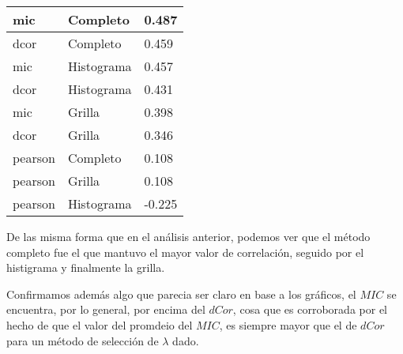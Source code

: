     \begin{table}[H]
        \centering
        \begin{tabular}{|l|l|l|}\hline
        mic     & Completo    & 0.487  \\\hline
        dcor    & Completo    & 0.459  \\
        mic     & Histograma  & 0.457  \\
        dcor    & Histograma  & 0.431  \\
        mic     & Grilla      & 0.398  \\
        dcor    & Grilla      & 0.346 \\
        pearson & Completo    & 0.108  \\
        pearson & Grilla      & 0.108  \\
        pearson & Histograma  & -0.225 \\\hline
        \end{tabular}
    \end{table}
    
    De las misma forma que en el an\'alisis anterior, podemos ver que el m\'etodo completo fue el que mantuvo el mayor valor de correlaci\'on, seguido por el histigrama y finalmente la grilla. 
    
    Confirmamos adem\'as algo que parecia ser claro en base a los gr\'aficos, el $MIC$ se encuentra, por lo general, por encima del $dCor$, cosa que es corroborada por el hecho de que el valor del promdeio del $MIC$, es siempre mayor que el de $dCor$ para un m\'etodo de selecci\'on de $\lambda$ dado.